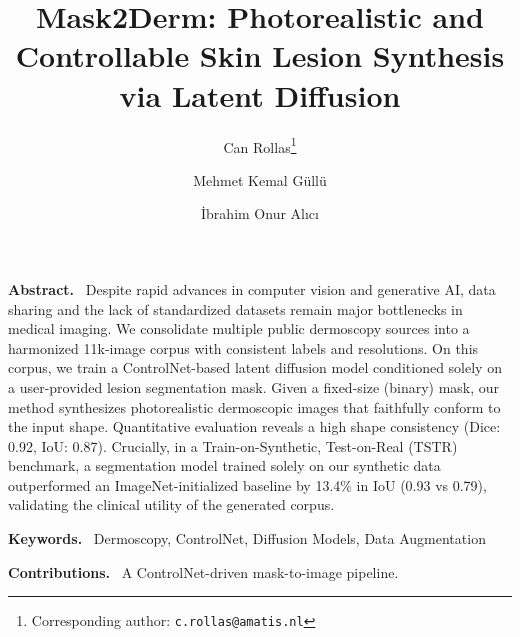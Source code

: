 \documentclass[a4paper,11pt]{article}
\newenvironment{boxedabstract}
{\begin{tcolorbox}\textbf{Abstract.}\ }
{\end{tcolorbox}}
\newenvironment{contributions}{\par\noindent\textbf{Contributions.}\ }{\par}
\newenvironment{keywordsblock}{\par\noindent\textbf{Keywords.}\ }{\par}
\begin{document}
\title{\vspace{-6mm}\Large Mask2Derm: Photorealistic and Controllable Skin Lesion Synthesis via Latent Diffusion}
\author[1,2]{Can Rollas\thanks{Corresponding author: \texttt{c.rollas@amatis.nl}}}
\author[1,3]{Mehmet Kemal Güllü}
\author[1,4]{İbrahim Onur Alıcı}


\date{} %
\maketitle

\begin{boxedabstract}
Despite rapid advances in computer vision and generative AI, data sharing and the lack of standardized datasets remain major bottlenecks in medical imaging. We consolidate multiple public dermoscopy sources into a harmonized 11k-image corpus with consistent labels and resolutions. On this corpus, we train a ControlNet-based latent diffusion model conditioned solely on a user-provided lesion segmentation mask. Given a fixed-size (binary) mask, our method synthesizes photorealistic dermoscopic images that faithfully conform to the input shape. Quantitative evaluation reveals a high shape consistency (Dice: 0.92, IoU: 0.87). Crucially, in a Train-on-Synthetic, Test-on-Real (TSTR) benchmark, a segmentation model trained solely on our synthetic data outperformed an ImageNet-initialized baseline by 13.4\% in IoU (0.93 vs 0.79), validating the clinical utility of the generated corpus.  
\end{boxedabstract}

\begin{keywordsblock}
Dermoscopy, ControlNet, Diffusion Models, Data Augmentation
\end{keywordsblock}

\vspace{2mm}
\begin{contributions}
A ControlNet-driven mask-to-image pipeline.
\end{contributions}

\end{document}
